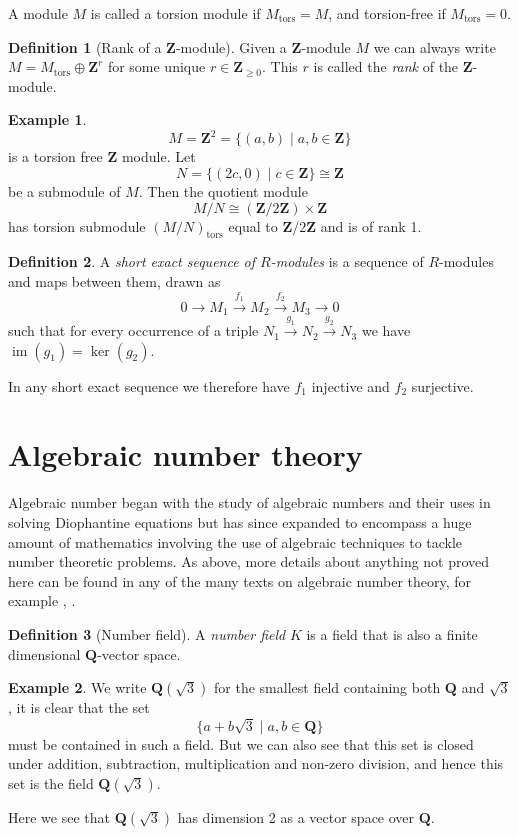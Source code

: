 \documentclass[a4paper,abstracton,bibtotoc]{scrreprt}
\theoremstyle{definition}
\newtheorem{defn}{Definition}
\newtheorem{ex}{Example}
\newcommand{\QQ}{\mathbf{Q}}
\newcommand{\ZZ}{\mathbf{Z}}
\DeclareMathOperator{\im}{im}
\begin{document}
A module $M$ is called a torsion module if $M_\text{tors} = M$, and torsion-free if $M_\text{tors} = 0$.


\begin{defn}[Rank of a $\ZZ$-module]
Given a $\ZZ$-module $M$ we can always write $M = M_\text{tors} \oplus \ZZ^r$ for some unique $r\in \ZZ_{\ge 0}$.
This $r$ is called the \emph{rank} of the $\ZZ$-module.
\end{defn}

\begin{ex}
\[M = \ZZ^2 = \{(a,b)\mid a,b\in \ZZ\}\]
is a torsion free $\ZZ$ module. Let
\[N = \{(2c,0) \mid c\in\ZZ\} \cong \ZZ\]
be a submodule of $M$.
Then the quotient module
\[M/N \cong (\ZZ/2\ZZ)\times \ZZ\]
has torsion submodule $(M/N)_\text{tors}$ equal to $\ZZ/2\ZZ$ and is of rank 1.
\end{ex}

\begin{defn}
A \emph{short exact sequence of $R$-modules} is a sequence of $R$-modules and maps between them, drawn as
\[
0 \to M_1 \xrightarrow{f_1} M_2 \xrightarrow{f_2} M_3 \to 0
\]
such that for every occurrence of a triple $N_1 \xrightarrow{g_1} N_2 \xrightarrow{g_2} N_3$ we have $\im(g_1) = \ker(g_2)$.
\end{defn}

In any short exact sequence we therefore have $f_1$ injective and $f_2$ surjective.


\section{Algebraic number theory}
\label{sec:ant}

Algebraic number began with the study of algebraic numbers and their uses in solving Diophantine equations but has since expanded to encompass a huge amount of mathematics involving the use of algebraic techniques to tackle number theoretic problems. %
As above, more details about anything not proved here can be found in any of the many texts on algebraic number theory, for example \cite{neukirch}, \cite{lang}.

\begin{defn}[Number field]
A \emph{number field} $K$ is a field that is also a finite dimensional $\QQ$-vector space.
\end{defn}

\begin{ex}\label{ex:quad}
We write $\QQ(\sqrt{3})$ for the smallest field containing both $\QQ$ and $\sqrt{3}$, it is clear that the set
\[
\{a + b\sqrt{3}\mid a,b \in \QQ\}
\]
must be contained in such a field.
But we can also see that this set is closed under addition, subtraction, multiplication and non-zero division, and hence this set is the field $\QQ(\sqrt{3})$.

Here we see that $\QQ(\sqrt{3})$ has dimension 2 as a vector space over $\QQ$.
\end{ex}
\end{document}
